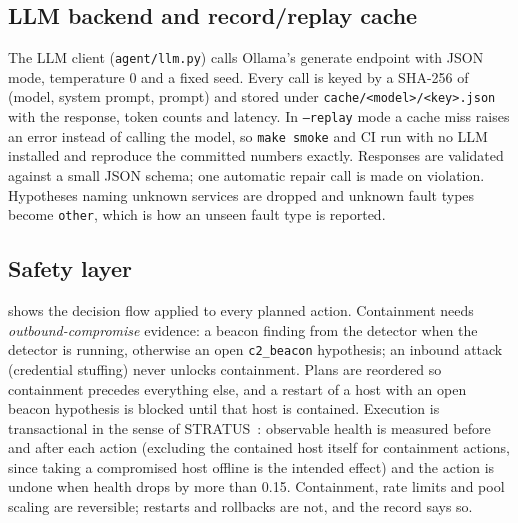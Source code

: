 \documentclass[11pt,a4paper]{article}
\newcommand{\code}[1]{\texttt{#1}}
\begin{document}
\subsection{LLM backend and record/replay cache}
The LLM client (\code{agent/llm.py}) calls Ollama's generate endpoint with JSON mode, temperature 0
and a fixed seed. Every call is keyed by a SHA-256 of (model, system prompt, prompt) and stored under
\code{cache/<model>/<key>.json} with the response, token counts and latency. In \code{--replay} mode
a cache miss raises an error instead of calling the model, so \code{make smoke} and CI run with no
LLM installed and reproduce the committed numbers exactly. Responses are validated against a small
JSON schema; one automatic repair call is made on violation. Hypotheses naming unknown services are
dropped and unknown fault types become \code{other}, which is how an unseen fault type is reported.

\subsection{Safety layer}
\label{sec:safety}
 shows the decision flow applied to every planned action. Containment needs
\emph{outbound-compromise} evidence: a beacon finding from the detector when the detector is
running, otherwise an open \code{c2\_beacon} hypothesis; an inbound attack (credential stuffing)
never unlocks containment. Plans are reordered so containment precedes everything else, and a
restart of a host with an open beacon hypothesis is blocked until that host is contained. Execution
is transactional in the sense of STRATUS~\cite{stratus}: observable health is measured before and
after each action (excluding the contained host itself for containment actions, since taking a
compromised host offline is the intended effect) and the action is undone when health drops by more
than 0.15. Containment, rate limits and pool scaling are reversible; restarts and rollbacks are not,
and the record says so.
\end{document}
